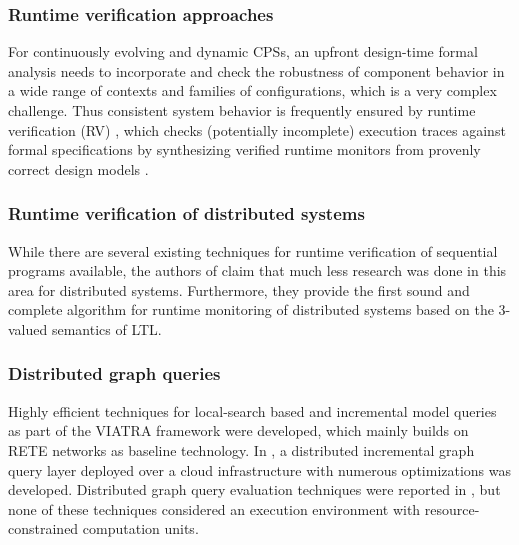 \subsubsection{Runtime verification approaches}
For continuously evolving and dynamic CPSs, an upfront design-time formal analysis needs to incorporate and check the robustness of component behavior in a wide range of contexts and families of configurations, %
which is a very complex challenge. Thus consistent system behavior is frequently ensured by runtime verification (RV) \cite{Leucker2009}, which checks (potentially incomplete) execution traces against formal specifications by synthesizing verified runtime monitors from provenly correct design models \cite{Mitsch2014,Joshi2017}.

\subsubsection{Runtime verification of distributed systems}
While there are several existing techniques for runtime verification of sequential programs available, the authors of \cite{Mostafa2015} claim that much less research was done in this area for distributed systems. Furthermore, they provide the first sound and complete algorithm for runtime monitoring of distributed systems based on the 3-valued semantics of LTL.

\subsubsection{Distributed graph queries}
Highly efficient techniques for local-search based \cite{icgt2015} and incremental model queries \cite{scp2015} as part of the VIATRA framework were developed, which mainly builds on RETE networks as baseline technology. In \cite{models2014-iqd}, a distributed incremental graph query layer deployed over a cloud infrastructure with numerous optimizations was developed. 
Distributed graph query evaluation techniques were reported in \cite{Mitschke2014,Peters2014,Krause2014}, but none of these techniques considered an execution environment with resource-constrained computation units.

